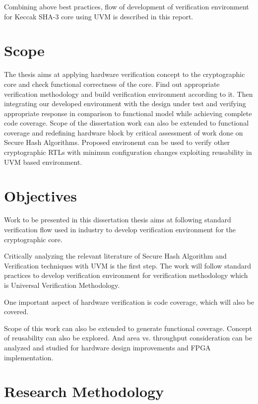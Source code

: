 Combining above best practices, flow of development of verification environment for Keccak SHA-3 core using UVM is described in this report.

\section{Scope}

The thesis aims at applying hardware verification concept to the cryptographic core and check functional correctness of the core. Find out appropriate verification methodology and build verification environment according to it. Then integrating our developed environment with the design under test and verifying appropriate response in comparison to functional model while achieving complete code coverage. Scope of the dissertation work can also be extended to functional coverage and redefining hardware block by critical assessment of work done on Secure Hash Algorithms. Proposed environemt can be used to verify other cryptographic RTLs with minimun configuration changes exploiting reusability in UVM based environment.

\section{Objectives}

Work to be presented in this dissertation thesis aims at following standard verification flow used in industry to develop verification environment for the cryptographic core. \par

Critically analyzing the relevant literature of Secure Hash Algorithm and Verification techniques with UVM is the first step. The work will follow standard practices to develop verification environment for verification methodology which is Universal Verification Methodology. \par

One important aspect of hardware verification is code coverage, which will also be covered. \par

Scope of this work can also be extended to generate functional coverage. Concept of reusability can also be explored. And area vs. throughput consideration can be analyzed and studied for hardware design improvements and FPGA implementation. \par

\section{Research Methodology}

